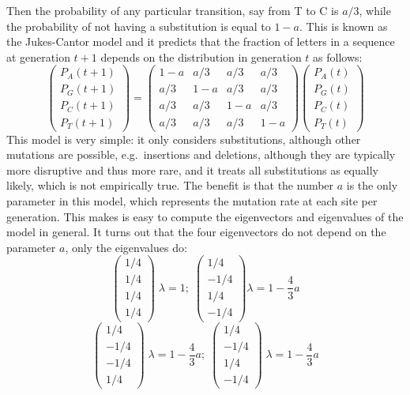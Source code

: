 \documentclass[
  letterpaper,
  DIV=11,
  numbers=noendperiod]{scrreprt}
\begin{document}
Then the probability of any particular transition, say from T to C is
\(a/3\), while the probability of not having a substitution is equal to
\(1-a\). This is known as the Jukes-Cantor model and it predicts that
the fraction of letters in a sequence at generation \(t+1\) depends on
the distribution in generation \(t\) as follows:
\[   \left(\begin{array}{c} P_A(t+1) \\ P_G(t+1) \\ P_C(t+1) \\ P_T(t+1) \end{array}\right) = \left(\begin{array}{cccc}1-a & a/3 & a/3 & a/3 \\a/3 & 1-a & a/3 & a/3 \\a/3 & a/3 & 1-a & a/3 \\a/3 & a/3 & a/3 & 1-a\end{array}\right) \left(\begin{array}{c} P_A(t) \\ P_G(t) \\ P_C(t) \\ P_T(t) \end{array}\right) \]
This model is very simple: it only considers substitutions, although
other mutations are possible, e.g.~insertions and deletions, although
they are typically more disruptive and thus more rare, and it treats all
substitutions as equally likely, which is not empirically true. The
benefit is that the number \(a\) is the only parameter in this model,
which represents the mutation rate at each site per generation. This
makes is easy to compute the eigenvectors and eigenvalues of the model
in general. It turns out that the four eigenvectors do not depend on the
parameter \(a\), only the eigenvalues do:
\[  \left(\begin{array}{c} 1/4 \\ 1/4 \\ 1/4 \\ 1/4 \end{array}\right) \; \lambda =1; \; \left(\begin{array}{c} 1/4 \\ -1/4 \\ 1/4 \\ -1/4 \end{array}\right) \lambda =1-\frac{4}{3}a \]
\[ \left(\begin{array}{c} 1/4 \\ -1/4 \\ -1/4 \\ 1/4 \end{array}\right) \; \lambda =1-\frac{4}{3}a;  \; \left(\begin{array}{c} 1/4 \\ -1/4 \\ 1/4 \\ -1/4 \end{array}\right) \; \lambda =1-\frac{4}{3}a\]
\end{document}
